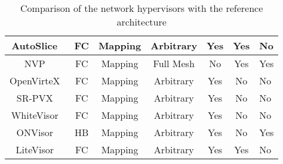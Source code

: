 \begin{table}[ht]
{\begin{tabular}{|c|c|c|c|c|c|l|}
AutoSlice~\cite{AutoSlice-Bozakov2012,AutoSlice2-Bozakov2014}   & FC                  & Mapping       & Arbitrary     & Yes & Yes & No       \\ \hline
NVP~\cite{NVP-Koponen2014}                                      & FC                  & Mapping       & Full Mesh     & No  & Yes & Yes      \\ \hline
OpenVirteX~\cite{OpenVirteX-Al-Shabibi2014}                     & FC                  & Mapping       & Arbitrary     & Yes & No  & No       \\ \hline
SR-PVX~\cite{PVX-Li2017}                                        & FC                       & Mapping       & Arbitrary     & Yes & No  & No       \\ \hline
WhiteVisor~\cite{whitevisor-Yu2019}                             & FC                 & Mapping       & Arbitrary     & Yes & No  & No       \\ \hline
ONVisor~\cite{ONVisor-Han2018}                                  & HB                       & Mapping       & Arbitrary     & Yes & No  & Yes      \\ \hline
LiteVisor~\cite{Litevisor-Yang2018}                             & FC                  & Mapping       & Arbitrary     & Yes & Yes & No       \\ \hline
\end{tabular}%
}
\caption{Comparison of the network hypervisors with the reference architecture}
\label{tab:comparison-refarchi}
\end{table}